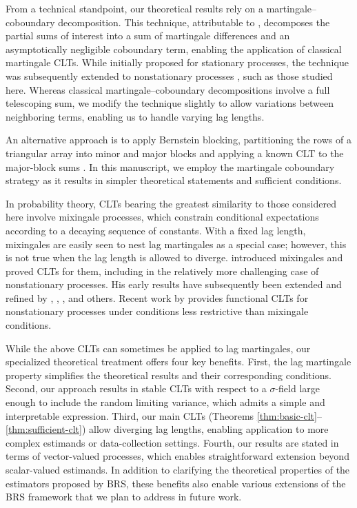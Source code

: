 \documentclass[11pt]{article}
\theoremstyle{definition}
\begin{document}
From a technical standpoint, our theoretical results rely on a martingale--coboundary decomposition.
This technique, attributable to \citet{gordin1969central}, decomposes the partial sums of interest into a sum of martingale differences and an asymptotically negligible coboundary term, enabling the application of classical martingale CLTs.
While initially proposed for stationary processes, the technique was subsequently extended to nonstationary processes \citep{philipp1975almost,volny2006}, such as those studied here.
Whereas classical martingale--coboundary decompositions involve a full telescoping sum, we modify the technique slightly to allow variations between neighboring terms, enabling us to handle varying lag lengths.

An alternative approach is to apply Bernstein blocking, partitioning the rows of a triangular array into minor and major blocks and applying a known CLT to the major-block sums \citep{bernstein_sur_1927,Dehling2002}.
In this manuscript, we employ the martingale coboundary strategy as it results in simpler theoretical statements and sufficient conditions.

In probability theory, CLTs bearing the greatest similarity to those considered here involve mixingale processes, which constrain conditional expectations according to a decaying sequence of constants.
With a fixed lag length, mixingales are easily seen to nest lag martingales as a special case; however, this is not true when the lag length is allowed to diverge.
\citet{mcleish1975invariance, mcleish1977invariance} introduced mixingales and proved CLTs for them, including in the relatively more challenging case of nonstationary processes.
His early results have subsequently been extended and refined by \citet{Wooldridge_White_1988}, \citet{deJong_1997}, \citet{IkedaShinS.2017Anom}, and others.
Recent work by \citet{merlevede2019} provides functional CLTs for nonstationary processes under conditions less restrictive than mixingale conditions.

While the above CLTs can sometimes be applied to lag martingales, our specialized theoretical treatment offers four key benefits.
First, the lag martingale property simplifies the theoretical results and their corresponding conditions.
Second, our approach results in stable CLTs with respect to a $\sigma$-field large enough to include the random limiting variance, which admits a simple and interpretable expression.
Third, our main CLTs (Theorems \ref{thm:basic-clt}--\ref{thm:sufficient-clt}) allow diverging lag lengths, enabling application to more complex estimands or data-collection settings.
Fourth, our results are stated in terms of vector-valued processes, which enables straightforward extension beyond scalar-valued estimands.
In addition to clarifying the theoretical properties of the estimators proposed by BRS, these benefits also enable various extensions of the BRS framework that we plan to address in future work.
\end{document}
